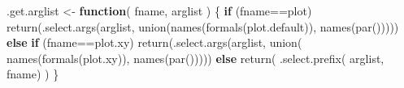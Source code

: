\documentclass[
  letterpaper,
  DIV=11,
  numbers=noendperiod]{scrartcl}
\newenvironment{Shaded}{\begin{snugshade}}{\end{snugshade}}
\newcommand{\ControlFlowTok}[1]{\textcolor[rgb]{0.00,0.23,0.31}{\textbf{#1}}}
\newcommand{\FunctionTok}[1]{\textcolor[rgb]{0.28,0.35,0.67}{#1}}
\newcommand{\NormalTok}[1]{\textcolor[rgb]{0.00,0.23,0.31}{#1}}
\newcommand{\OtherTok}[1]{\textcolor[rgb]{0.00,0.23,0.31}{#1}}
\newcommand{\SpecialCharTok}[1]{\textcolor[rgb]{0.37,0.37,0.37}{#1}}
\newcommand{\StringTok}[1]{\textcolor[rgb]{0.13,0.47,0.30}{#1}}
\begin{document}
\begin{Shaded}
\begin{Highlighting}[]
\NormalTok{.get.arglist }\OtherTok{\textless{}{-}} \ControlFlowTok{function}\NormalTok{( fname, arglist ) \{}
     \ControlFlowTok{if}\NormalTok{ (fname}\SpecialCharTok{==}\StringTok{\textquotesingle{}plot\textquotesingle{}}\NormalTok{)}
       \FunctionTok{return}\NormalTok{(}\FunctionTok{.select.args}\NormalTok{(arglist,}
                           \FunctionTok{union}\NormalTok{(}\FunctionTok{names}\NormalTok{(}\FunctionTok{formals}\NormalTok{(plot.default)), }\FunctionTok{names}\NormalTok{(}\FunctionTok{par}\NormalTok{()))))}
     \ControlFlowTok{else} \ControlFlowTok{if}\NormalTok{ (fname}\SpecialCharTok{==}\StringTok{\textquotesingle{}plot.xy\textquotesingle{}}\NormalTok{)}
       \FunctionTok{return}\NormalTok{(}\FunctionTok{.select.args}\NormalTok{(arglist,}
                           \FunctionTok{union}\NormalTok{( }\FunctionTok{names}\NormalTok{(}\FunctionTok{formals}\NormalTok{(plot.xy)), }\FunctionTok{names}\NormalTok{(}\FunctionTok{par}\NormalTok{()))))}
     \ControlFlowTok{else} \FunctionTok{return}\NormalTok{( }\FunctionTok{.select.prefix}\NormalTok{( arglist, fname) )}
\NormalTok{ \}}


\end{Highlighting}
\end{Shaded}
\end{document}
